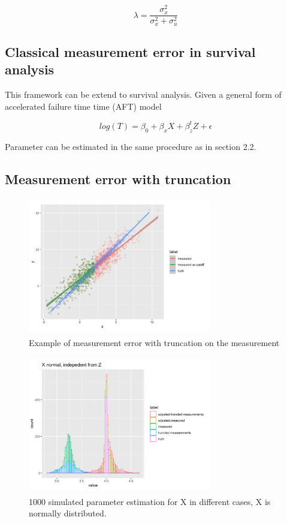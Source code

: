 \documentclass{article}
\begin{document}
\begin{equation}
\lambda = \frac{\sigma_{x}^2}{\sigma_{x}^2 + \sigma_{u}^2}
\end{equation}





\subsection{Classical measurement error in survival analysis}

This framework can be extend to survival analysis. Given a general form of accelerated failure time time  (AFT) model

\begin{equation}
log(T) = \beta_0 + \beta_x   X + \beta_{z}^t Z + \epsilon
\end{equation}


Parameter can be estimated in the same procedure as in section 2.2.



\subsection{Measurement error with truncation}

\begin{figure}[h]
\centering
\includegraphics[width = 8cm,height = 6cm]{figure-2.png}
\caption{Example of measurement error with truncation on the measurement}
\label{fig2}
\end{figure}



\begin{figure}[h]
\centering
\includegraphics[width = 8cm,height = 6cm]{figure-3.png}
\caption{1000 simulated parameter estimation for X in different cases, X is normally distributed. }
\label{fig3}
\end{figure}
\end{document}
